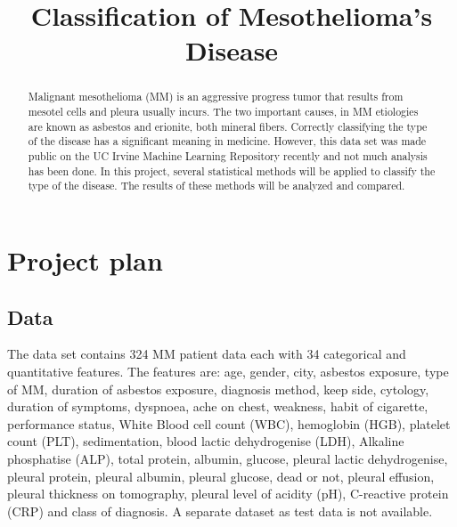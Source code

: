 \documentclass[conference,onecolumn]{IEEEtran}
\begin{document}
\nocite{*}
%
\title{Classification of Mesothelioma's Disease}


\author{
\and
{}
\and
{}
}

\maketitle

\begin{abstract}
Malignant mesothelioma (MM) is an aggressive progress tumor that results from mesotel cells and pleura usually incurs. The two important causes, in MM etiologies are known as asbestos and erionite, both mineral fibers. Correctly classifying the type of the disease has a significant meaning in medicine. However, this data set was made public on the UC Irvine Machine Learning Repository recently and not much analysis has been done. In this project, several statistical methods will be applied to classify the type of the disease. The results of these methods will be analyzed and compared.
\end{abstract}

\IEEEpeerreviewmaketitle

\section*{Project plan}
\subsection{Data}
The data set contains 324 MM patient data each with 34 categorical and quantitative features. The features are: age, gender, city, asbestos exposure, type of MM, duration of asbestos exposure, diagnosis method, keep side, cytology, duration of symptoms, dyspnoea, ache on chest, weakness, habit of cigarette, performance status, White Blood cell count (WBC), hemoglobin (HGB), platelet count (PLT), sedimentation, blood lactic dehydrogenise (LDH), Alkaline phosphatise (ALP), total protein, albumin, glucose, pleural lactic dehydrogenise, pleural protein, pleural albumin, pleural glucose, dead or not, pleural effusion, pleural thickness on tomography, pleural level of acidity (pH), C-reactive protein (CRP) and class of diagnosis. A separate dataset as test data is not available.
\end{document}
